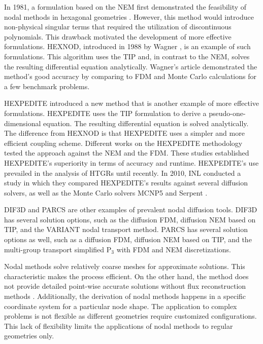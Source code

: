 In 1981, a formulation based on the \gls{NEM} first demonstrated the feasibility of nodal methods in hexagonal geometries \cite{duracz_nodal_1981}.
However, this method would introduce non-physical singular terms that required the utilization of discontinuous polynomials.
This drawback motivated the development of more effective formulations.
HEXNOD, introduced in 1988 by Wagner \cite{wagner_three-dimensional_1989}, is an example of such formulations.
This algorithm uses the \gls{TIP} and, in contrast to the \gls{NEM}, solves the resulting differential equation analytically.
Wagner's article demonstrated the method's good accuracy by comparing to \gls{FDM} and Monte Carlo calculations for a few benchmark problems.

HEXPEDITE \cite{fitzpatrick_hexpedite_1992} introduced a new method that is another example of more effective formulations.
HEXPEDITE uses the \gls{TIP} formulation to derive a pseudo-one-dimensional equation.
The resulting differential equation is solved analytically.
The difference from HEXNOD is that HEXPEDITE uses a simpler and more efficient coupling scheme.
Different works \cite{fitzpatrick_hexpedite_1992}\cite{fitzpatrick_developments_1995} on the HEXPEDITE methodology tested the approach against the \gls{NEM} and the \gls{FDM}.
These studies established HEXPEDITE’s superiority in terms of accuracy and runtime.
HEXPEDITE's use prevailed in the analysis of \glspl{HTGR} until recently.
In 2010, \gls{INL} conducted a study \cite{ortensi_deterministic_2010-1} in which they compared HEXPEDITE's results against several diffusion solvers, as well as the Monte Carlo solvers MCNP5 \cite{rsicc_computer_code_collection_mcnp5_2003} and Serpent \cite{leppanen_serpent_2015}.

DIF3D \cite{lawrence_dif3d_1983} and PARCS \cite{downar_parcs_2004} are other examples of prevalent nodal diffusion tools.
DIF3D has several solution options, such as the diffusion \gls{FDM}, diffusion \gls{NEM} based on \gls{TIP}, and the VARIANT nodal transport method.
PARCS has several solution options as well, such as a diffusion \gls{FDM}, diffusion \gls{NEM} based on \gls{TIP}, and the multi-group transport simplified P$_3$ with \gls{FDM} and \gls{NEM} discretizations.

Nodal methods solve relatively coarse meshes for approximate solutions.
This characteristic makes the process efficient.
On the other hand, the method does not provide detailed point-wise accurate solutions without flux reconstruction methods \cite{kang_finite_1973} \cite{boeer_fast_1992}.
Additionally, the derivation of nodal methods happens in a specific coordinate system for a particular node shape.
The application to complex problems is not flexible as different geometries require customized configurations.
This lack of flexibility limits the applications of nodal methods to regular geometries only.

